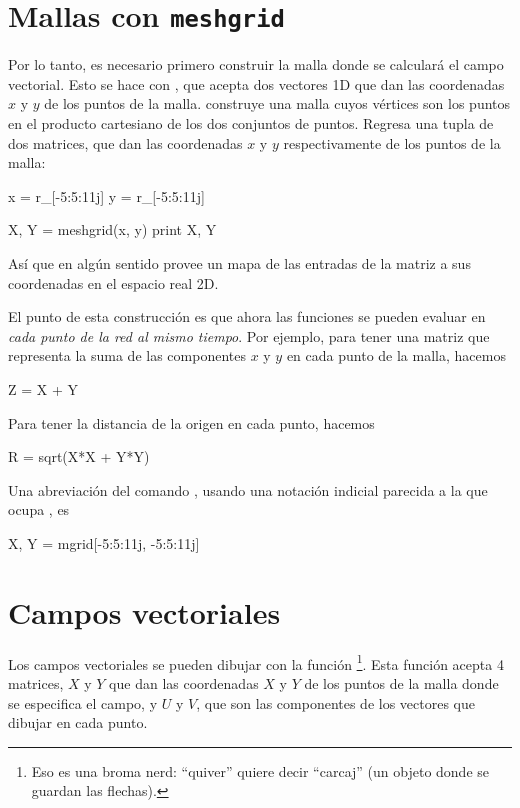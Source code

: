 \section{Mallas con \texttt{meshgrid}}



Por lo tanto, es necesario primero construir la malla donde se calculará el campo vectorial. Esto se hace con , que acepta dos vectores 1D que dan las coordenadas $x$ y $y$ de los puntos de la malla.  construye una malla cuyos vértices son los puntos en el producto cartesiano de los dos conjuntos de puntos. Regresa una tupla de dos matrices, que dan las coordenadas $x$ y $y$ respectivamente de los puntos de la malla:
\begin{python}
x = r_[-5:5:11j]
y = r_[-5:5:11j]

X, Y = meshgrid(x, y)
print X, Y
\end{python}
Así que  en algún sentido provee un mapa de las entradas de la matriz a sus coordenadas en el espacio real 2D.

El punto de esta construcción es que ahora las funciones se pueden evaluar en \emph{cada punto de la red al mismo tiempo}. Por ejemplo, para tener una matriz que representa la suma de las componentes $x$ y $y$ en cada punto de la malla, hacemos
\begin{python}
Z = X + Y
\end{python}
Para tener la distancia de la origen en cada punto, hacemos
\begin{python}
R = sqrt(X*X + Y*Y)
\end{python}

Una abreviación del comando , usando una notación indicial parecida a la que ocupa , es
\begin{python}
X, Y = mgrid[-5:5:11j, -5:5:11j]
\end{python}



\section{Campos vectoriales}
Los campos vectoriales se pueden dibujar con la función \footnote{Eso es una broma nerd: ``quiver'' quiere decir ``carcaj'' (un objeto donde se guardan las flechas).}. Esta función acepta 4 matrices, $X$ y $Y$ que dan las coordenadas $X$ y $Y$ de los puntos de la malla donde se especifica el campo, y $U$ y $V$, que son las componentes de los vectores que dibujar en cada punto.


